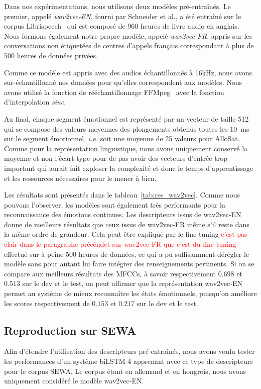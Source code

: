 Dans nos expérimentations, nous utilisons deux modèles pré-entraînés. Le premier, appelé \textit{wav2vec-EN}, fourni par Schneider et al.,  a été entraîné sur le corpus Librispeech~\cite{librispeech} qui est composé de 960 heures de livre audio en anglais.
Nous formons également notre propre modèle, appelé \textit{wav2vec-FR}, appris sur les conversations non étiquetées de centres d'appels français correspondant à plus de 500 heures de données privées.

Comme ce modèle est appris avec des audios échantillonnés à 16kHz, nous avons sur-échantillonné nos données pour qu'elles correspondent aux modèles. Nous avons utilisé la fonction de rééchantillonnage FFMpeg~\cite{Tomar2006} avec la fonction d'interpolation \textit{sinc}.

Au final, chaque segment émotionnel est représenté par un vecteur de taille 512 qui se compose des valeurs moyennes des plongements obtenus toutes les 10~ms sur le segment émotionnel, \textit{i.e.} soit une moyenne de 25 valeurs pour AlloSat. Comme pour la représentation linguistique, nous avons uniquement conservé la moyenne et non l'écart type pour de pas avoir des vecteurs d'entrée trop important qui aurait fait exploser la complexité et donc le temps d'apprentissage et les ressources nécessaires pour le mener à bien.



Les résultats sont présentés dans le tableau~\ref{tab:res_wav2vec}. Comme nous pouvons l'observer, les modèles sont également très performants pour la reconnaissance des émotions continues. Les descripteurs issus de wav2vec-EN donne de meilleurs résultats que ceux issus de wav2vec-FR même s'il reste dans la même ordre de grandeur. Cela peut être expliqué par le fine-tuning \textcolor{red}{c'est pas clair dans le paragraphe précéndet sur wav2vec-FR que c'est du fine-tuning} effectué sur à peine 500 heures de données, ce qui a pu suffisamment dérégler le modèle sans pour autant lui faire intégrer des renseignements pertinents. Si on se compare aux meilleurs résultats des MFCCs, à savoir respectivement $0.698$ et $0.513$ sur le dev et le test, on peut affirmer que la représentation wav2vec-EN permet au système de mieux reconnaître les états émotionnels, puisqu'on améliore les scores respectivement de $0.153$ et $0.217$ sur le dev et le test.

\subsection{Reproduction sur SEWA}
Afin d'étendre l'utilisation des descripteurs pré-entraînés, nous avons voulu tester les performances d'un système biLSTM-4 apprenant avec ce type de descripteurs pour le corpus SEWA. Le corpus étant en allemand et en hongrois, nous avons uniquement considéré le modèle wav2vec-EN.

